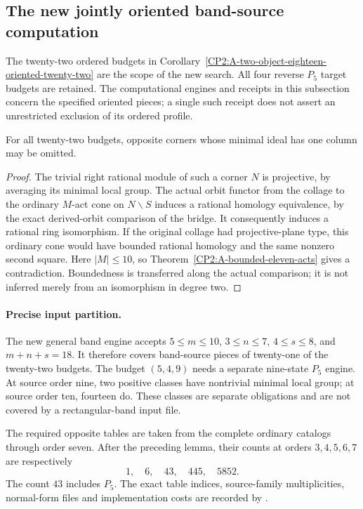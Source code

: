 \subsection{The new jointly oriented band-source computation}

The twenty-two ordered budgets in
Corollary~\ref{CP2:A-two-object-eighteen-oriented-twenty-two}
are the scope of the new search.  All four reverse $P_5$
target budgets are retained.  The computational engines
and receipts in this subsection concern the specified
oriented pieces; a single such receipt does not assert
an unrestricted exclusion of its ordered profile.

\begin{lemma}
\label{CP2:A-oriented-eighteen-projective-targets}
For all twenty-two budgets, opposite corners whose minimal
ideal has one column may be omitted.
\end{lemma}
\begin{proof}
The trivial right rational module of such a corner $N$
is projective, by averaging its minimal local group.
The actual orbit functor from the collage to the ordinary
$M$-act cone on $N\backslash S$ induces a rational
homology equivalence, by the exact derived-orbit comparison
of the bridge.  It consequently induces a rational ring
isomorphism.  If the original collage had projective-plane
type, this ordinary cone would have bounded rational
homology and the same nonzero second square.  Here
$|M|\leq10$, so Theorem~\ref{CP2:A-bounded-eleven-acts}
gives a contradiction.  Boundedness is transferred along
the actual comparison; it is not inferred merely from
an isomorphism in degree two.
\end{proof}

\paragraph{Precise input partition.}
The new general band engine accepts $5\leq m\leq10$,
$3\leq n\leq7$, $4\leq s\leq8$, and $m+n+s=18$.
It therefore covers band-source pieces of twenty-one
of the twenty-two budgets.  The budget $(5,4,9)$ needs
a separate nine-state $P_5$ engine.  At source order
nine, two positive classes have nontrivial minimal local
group; at source order ten, fourteen do.  These classes
are separate obligations and are not covered by a
rectangular-band input file.

The required opposite tables are taken from the complete
ordinary catalogs through order seven.  After the preceding
lemma, their counts at orders $3,4,5,6,7$ are respectively
\[
 1,\quad6,\quad43,\quad445,\quad5852.
\]
The count $43$ includes $P_5$.  The exact table indices,
source-family multiplicities, normal-form files and
implementation costs are recorded by
.

